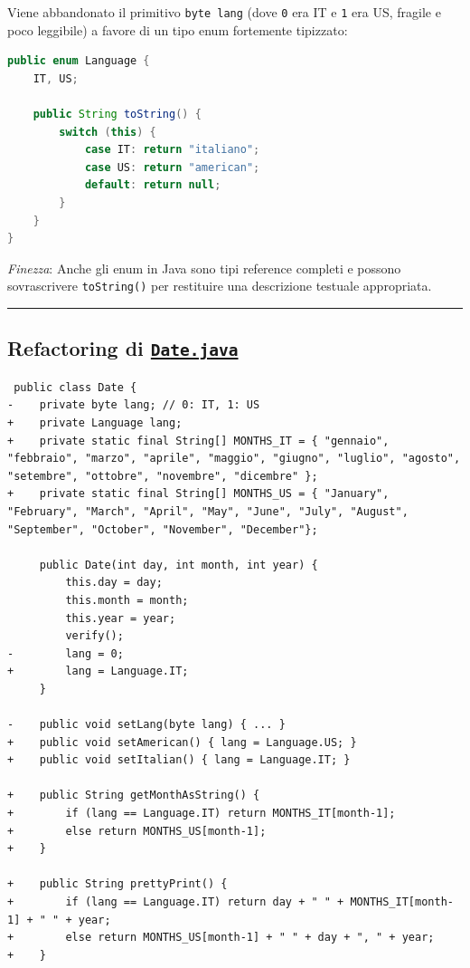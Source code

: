 \documentclass[11pt,a4paper,oneside]{report}
\newcommand{\passthrough}[1]{#1}
\begin{document}
Viene abbandonato il primitivo \passthrough{\lstinline!byte lang!} (dove
\passthrough{\lstinline!0!} era IT e \passthrough{\lstinline!1!} era US,
fragile e poco leggibile) a favore di un tipo enum fortemente tipizzato:

\begin{lstlisting}[language=Java]
public enum Language {
    IT, US;

    public String toString() {
        switch (this) {
            case IT: return "italiano";
            case US: return "american";
            default: return null;
        }
    }
}
\end{lstlisting}

\emph{Finezza}: Anche gli enum in Java sono tipi reference completi e
possono sovrascrivere \passthrough{\lstinline!toString()!} per
restituire una descrizione testuale appropriata.

\begin{center}\rule{0.5\linewidth}{0.5pt}\end{center}

\subsection{\texorpdfstring{Refactoring di
\href{file:///home/wally/Documenti/GitHub/Programmazione-II/25-26/Teoria-e-Esercitazioni/Codice-20260902/Lezione08/SimpleDate/src/Date.java}{\texttt{Date.java}}}{Refactoring di Date.java}}\label{chap07_refactoring-di-date.java}

\begin{lstlisting}
 public class Date {
-    private byte lang; // 0: IT, 1: US
+    private Language lang;
+    private static final String[] MONTHS_IT = { "gennaio", "febbraio", "marzo", "aprile", "maggio", "giugno", "luglio", "agosto", "setembre", "ottobre", "novembre", "dicembre" };
+    private static final String[] MONTHS_US = { "January", "February", "March", "April", "May", "June", "July", "August", "September", "October", "November", "December"};

     public Date(int day, int month, int year) {
         this.day = day;
         this.month = month;
         this.year = year;
         verify();
-        lang = 0;
+        lang = Language.IT;
     }

-    public void setLang(byte lang) { ... }
+    public void setAmerican() { lang = Language.US; }
+    public void setItalian() { lang = Language.IT; }

+    public String getMonthAsString() {
+        if (lang == Language.IT) return MONTHS_IT[month-1];
+        else return MONTHS_US[month-1];
+    }

+    public String prettyPrint() {
+        if (lang == Language.IT) return day + " " + MONTHS_IT[month-1] + " " + year;
+        else return MONTHS_US[month-1] + " " + day + ", " + year;
+    }
\end{lstlisting}
\end{document}

